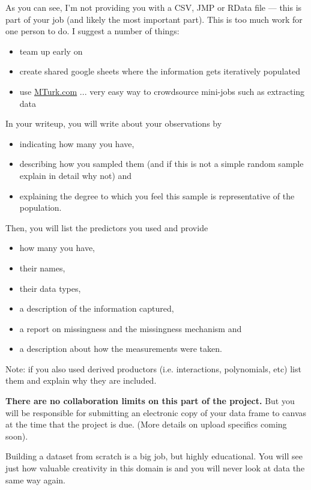 \documentclass[12pt]{article}
\begin{document}
As you can see, I'm not providing you with a CSV, JMP or RData file --- this is part of your job (and likely the most important part). This is too much work for one person to do. I suggest a number of things:

\begin{itemize}
\item team up early on
\item create shared google sheets where the information gets iteratively populated
\item use \url{MTurk.com} ... very easy way to crowdsource mini-jobs such as extracting data
\end{itemize}

In your writeup, you will write about your observations by

\begin{itemize}
\item indicating how many you have,
\item describing how you sampled them (and if this is not a simple random sample explain in detail why not) and
\item explaining the degree to which you feel this sample is representative of the population.
\end{itemize}

\noindent Then, you will list the predictors you used and provide

\begin{itemize}
\item how many you have,
\item their names,
\item their data types,
\item a description of the information captured,
\item a report on missingness and the missingness mechanism and
\item a description about how the measurements were taken.
\end{itemize}

Note: if you also used derived productors (i.e. interactions, polynomials, etc) list them and explain why they are included.


\textbf{There are no collaboration limits on this part of the project.} But you will be responsible for submitting an electronic copy of your data frame to canvas at the time that the project is due. (More details on upload specifics coming soon).

Building a dataset from scratch is a big job, but highly educational. You will see just how valuable creativity in this domain is and you will never look at data the same way again.
\end{document}
